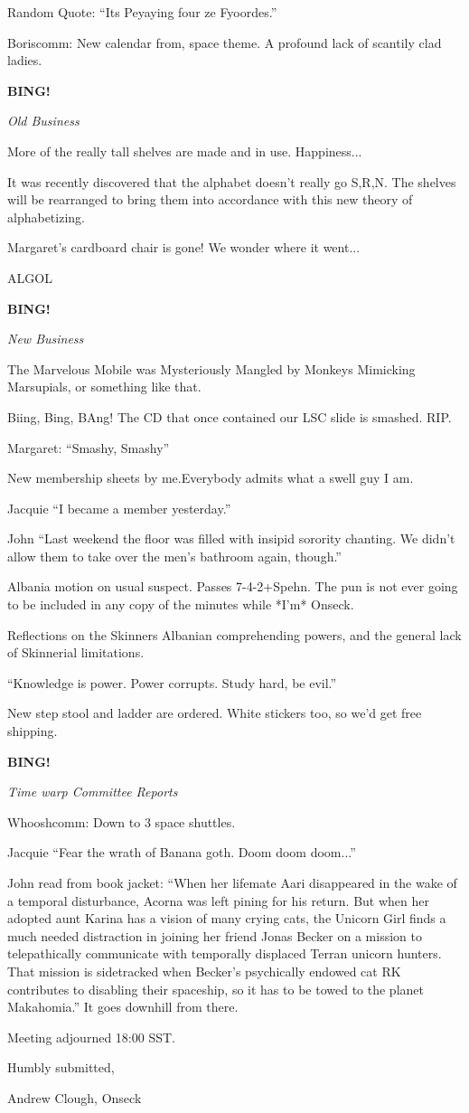\documentclass[12pt]{article}
\newcommand{\bing}{{\bf BING!} }
\newcommand{\goto}[1]{\bing \vskip 12pt \centerline{{\em{#1}}}}
\begin{document}
Random Quote:  ``Its Peyaying four ze Fyoordes.''

Boriscomm:  New calendar from, space theme.  A profound lack of scantily clad ladies.

\goto{Old Business}

More of the really tall shelves are made and in use.  Happiness...

It was recently discovered that the alphabet doesn't really go S,R,N.  The shelves will be rearranged to bring them into accordance with this new theory of alphabetizing.

Margaret's cardboard chair is gone!  We wonder where it went...

ALGOL

\goto{New Business}

The Marvelous Mobile was Mysteriously Mangled by Monkeys Mimicking Marsupials, or something like that.

Biing, Bing, BAng!  The CD that once contained our LSC slide is smashed.  RIP.

Margaret:  ``Smashy, Smashy''

New membership sheets by me.Everybody admits what a swell guy I am.

Jacquie ``I became a member yesterday.''

John  ``Last weekend the floor was filled with insipid sorority chanting.  We didn't allow them to take over the men's bathroom again, though.''

Albania motion on usual suspect.  Passes 7-4-2+Spehn.  The pun is not ever going to be included in any copy of the minutes while *I'm* Onseck.

Reflections on the Skinners Albanian comprehending powers, and the general lack of Skinnerial limitations.

``Knowledge is power. Power corrupts.  Study hard, be evil.''

New step stool and ladder are ordered.  White stickers too, so we'd get free shipping.

\goto{Time warp Committee Reports}

Whooshcomm:  Down to 3 space shuttles.

Jacquie  ``Fear the wrath of Banana goth.  Doom doom doom...''

John read from book jacket:  ``When her lifemate Aari disappeared in the wake of a temporal disturbance, Acorna was left pining for his return.  But when her adopted aunt Karina has a vision of many crying cats, the Unicorn Girl finds a much needed distraction in joining her friend Jonas Becker on a mission to telepathically communicate with temporally displaced Terran unicorn hunters.  That mission is sidetracked when Becker's psychically endowed cat RK contributes to disabling their spaceship, so it has to be towed to the planet Makahomia.''  It goes downhill from there.

\vspace{12pt}

\noindent
Meeting adjourned 18:00 SST.

\vspace{18pt}

\centerline{Humbly submitted,}
\centerline{Andrew Clough, Onseck}
\end{document}
